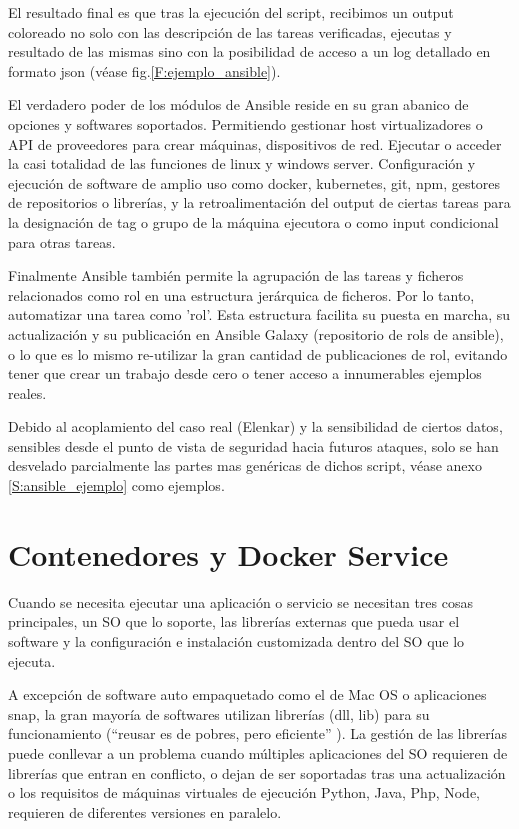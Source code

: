 El resultado final es que tras la ejecución del script, recibimos un output coloreado no solo con las descripción de las tareas verificadas, ejecutas  y resultado de las mismas sino con la posibilidad de acceso a un log detallado en formato json (véase fig.\ref{F:ejemplo_ansible}).

El verdadero poder de los módulos de Ansible reside en su gran abanico de opciones y softwares soportados. Permitiendo gestionar host virtualizadores o API de proveedores para crear máquinas, dispositivos de red. Ejecutar o acceder la casi totalidad de las funciones de linux y windows server. Configuración y ejecución de software de amplio uso como docker\cite{c_docker}, kubernetes\cite{c_kubernetes}, git\cite{c_git}, npm, gestores de repositorios o librerías, y la retroalimentación del output de ciertas tareas para la designación de tag o grupo de la máquina ejecutora o como input condicional para otras tareas.

Finalmente Ansible también permite la agrupación de las tareas y ficheros relacionados como rol en una estructura jerárquica de ficheros. Por lo tanto, automatizar una tarea como 'rol'. Esta estructura facilita su puesta en marcha, su actualización y su publicación en Ansible Galaxy (repositorio de rols de ansible), o lo que es lo mismo re-utilizar la gran cantidad de publicaciones de rol, evitando tener que crear un trabajo desde cero o tener acceso a innumerables ejemplos reales.

Debido al acoplamiento del caso real (Elenkar) y la sensibilidad de ciertos datos, sensibles desde el punto de vista de seguridad hacia futuros ataques, solo se han desvelado parcialmente las partes mas genéricas de dichos script, véase anexo \ref{S:ansible_ejemplo} como ejemplos.

\section{Contenedores y Docker Service}
Cuando se necesita ejecutar una aplicación o servicio se necesitan tres cosas principales, un SO que lo soporte, las librerías externas que pueda usar el software y la configuración e instalación customizada dentro del SO que lo ejecuta.

A excepción de software auto empaquetado como el de Mac OS o aplicaciones snap, la gran mayoría de softwares utilizan librerías (dll, lib) para su funcionamiento (“reusar es de pobres, pero eficiente” ). La gestión de las librerías puede conllevar a un problema cuando múltiples aplicaciones del SO requieren de librerías que entran en conflicto, o dejan de ser soportadas tras una actualización o los requisitos de máquinas virtuales de ejecución Python, Java, Php, Node, requieren de diferentes versiones en paralelo.

